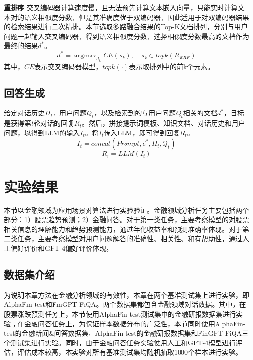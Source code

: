 \textbf{重排序} 交叉编码器计算速度慢，且无法预先计算文本嵌入向量，只能实时计算文本对的语义相似度分数，但是其准确度优于双编码器，因此适用于对双编码器结果的检索结果进行二次精排。本节选取多路融合结果的Top-K文档排列，分别与用户问题一起输入交叉编码器，得到语义相似度分数，选择相似度分数最高的文档作为最终的结果$d^*$。
\begin{equation}
	d^* = \mathop{\arg\max}_{d_k}CE(s_k), \quad s_k \in topk(R_{RRF})
\end{equation}
其中，$CE$表示交叉编码器模型，$topk(\cdot)$表示取排列中的前k个元素。

\subsection{回答生成}

给定对话历史$H_t$，用户问题$Q_t$，以及检索到的与用户问题$Q_t$相关的文档$d^*$，目标是获得第$t$轮对话的回复$R_t$。然后，拼接提示词模板、知识文档、对话历史和用户问题，以得到LLM的输入$I_t$。将$I_t$传入LLM，即可得到回复$R_t$。
\begin{equation}
	I_t = concat(Prompt, d^*, H_t, Q_t)
\end{equation}
\begin{equation}
	R_t = LLM(I_t)
\end{equation}

\section{实验结果}

本节以金融领域为应用场景对算法进行实验验证。金融领域分析任务主要包括两个部分：1）股票趋势预测；2）金融问答。对于第一类任务，主要考察模型的对股票相关信息的理解能力和趋势预测能力，通过年化收益率和预测准确率体现。对于第二类任务，主要考察模型对用户问题解答的准确性、相关性、和有帮助性，通过人工偏好评价和GPT-4偏好评价体现。

\subsection{数据集介绍}

为说明本章方法在金融分析领域的有效性，本章在两个基准测试集上进行实验，即AlphaFin-test和FinGPT-FiQA\cite{wang2023fingptbenchmark}。两个数据集都包含金融领域对话数据。其中，在股票涨跌预测任务上，本节使用AlphaFin-test测试集中的金融研报数据集进行实验；在金融问答任务上，为保证样本数据分布的广泛性，本节同时使用AlphaFin-test的金融新闻\&问答数据集、AlphaFin-test的金融研报数据集和FinGPT-FiQA三个测试集进行实验。同时，由于金融问答任务实验使用人工和GPT-4模型进行评估，评估成本较高，本实验对所有基准测试集均随机抽取1000个样本进行实验。

